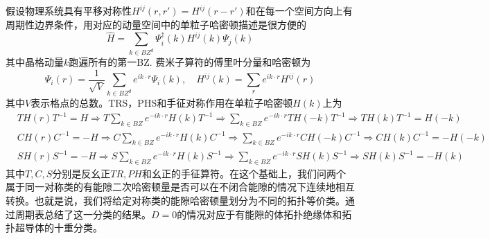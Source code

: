 \documentclass[a4paper]{article}
\numberwithin{equation}{subsection}
\begin{document}
假设物理系统具有平移对称性$H^{ij}(r,r')=H^{ij}(r-r')$和在每一个空间方向上有周期性边界条件，用对应的动量空间中的单粒子哈密顿描述是很方便的
\begin{equation}
    \hat{H}=\sum_{k\in BZ^d}\Psi_i^\dagger(k)H^{ij}(k)\Psi_j(k)
\end{equation}
其中晶格动量$k$跑遍所有的第一BZ. 费米子算符的傅里叶分量和哈密顿为
\begin{equation}
    \Psi_i(r)=\frac{1}{\sqrt{V}}\sum_{k\in BZ^d}e^{ik\cdot r}\Psi_i(k),\quad H^{ij}(k)=\sum_{r}e^{ik\cdot r}H^{ij}(r)
\end{equation}
其中$V$表示格点的总数。TRS，PHS和手征对称作用在单粒子哈密顿$H(k)$上为
\begin{equation}
    \begin{split}
        &TH(r)T^{-1}=H\Rightarrow T\sum_{k\in BZ}e^{-ik\cdot r}H(k)T^{-1}\Rightarrow\sum_{k\in BZ}e^{-ik\cdot r}TH(-k)T^{-1}\Rightarrow TH(k)T^{-1}=H(-k)\\
        &CH(r)C^{-1}=-H\Rightarrow C\sum_{k\in BZ}e^{-ik\cdot r}H(k)C^{-1}\Rightarrow\sum_{k\in BZ}e^{-ik\cdot r}CH(-k)C^{-1}\Rightarrow CH(k)C^{-1}=-H(-k)\\
        &SH(r)S^{-1}=-H\Rightarrow S\sum_{k\in BZ}e^{-ik\cdot r}H(k)S^{-1}\Rightarrow\sum_{k\in BZ}e^{-ik\cdot r}SH(k)S^{-1}\Rightarrow SH(k)S^{-1}=-H(k)
    \end{split}
\end{equation}
其中$T,C,S$分别是反幺正$TR,PH$和幺正的手征算符。在这个基础上，我们问两个属于同一对称类的有能隙二次哈密顿量是否可以在不闭合能隙的情况下连续地相互转换。也就是说，我们将给定对称类的能隙哈密顿量划分为不同的拓扑等价类。通过周期表总结了这一分类的结果。$D=0$的情况对应于有能隙的体拓扑绝缘体和拓扑超导体的十重分类。
\end{document}
